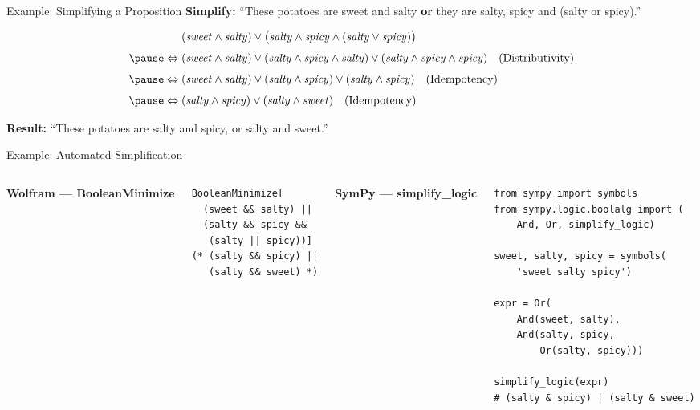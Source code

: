 \documentclass[aspectratio=169]{beamer}
\newcommand{\codelabel}[1]{\textbf{\footnotesize\color{dmDarkBlue}#1}\par\smallskip}
\newcommand{\Iff}{\Leftrightarrow}
\begin{document}
\begin{frame}{Example: Simplifying a Proposition}
  \textbf{Simplify:} ``These potatoes are sweet and salty \textbf{or} they are
  salty, spicy and (salty or spicy).''

  \medskip
  \small
  \begin{align*}
    & (\mathit{sweet} \land \mathit{salty})
      \lor
      \bigl(\mathit{salty} \land \mathit{spicy}
            \land (\mathit{salty} \lor \mathit{spicy})\bigr) \\[4pt]
    \pause
    \Iff\;
    & (\mathit{sweet} \land \mathit{salty})
      \lor (\mathit{salty} \land \mathit{spicy} \land \mathit{salty})
      \lor (\mathit{salty} \land \mathit{spicy} \land \mathit{spicy})
      \quad\text{(Distributivity)} \\[4pt]
    \pause
    \Iff\;
    & (\mathit{sweet} \land \mathit{salty})
      \lor (\mathit{salty} \land \mathit{spicy})
      \lor (\mathit{salty} \land \mathit{spicy})
      \quad\text{(Idempotency)} \\[4pt]
    \pause
    \Iff\;
    & (\mathit{salty} \land \mathit{spicy})
      \lor (\mathit{salty} \land \mathit{sweet})
      \quad\text{(Idempotency)}
  \end{align*}
  \normalsize

  \pause
  \bigskip
  \textbf{Result:} ``These potatoes are salty and spicy, or salty and sweet.''
\end{frame}

\begin{frame}[fragile]{Example: Automated Simplification}
  \begin{columns}[T]
      \codelabel{Wolfram — BooleanMinimize}
\begin{lstlisting}[style=wolfram]
BooleanMinimize[
  (sweet && salty) ||
  (salty && spicy &&
   (salty || spicy))]
(* (salty && spicy) ||
   (salty && sweet) *)
\end{lstlisting}
      \codelabel{SymPy — simplify\_logic}
\begin{lstlisting}[style=python]
from sympy import symbols
from sympy.logic.boolalg import (
    And, Or, simplify_logic)

sweet, salty, spicy = symbols(
    'sweet salty spicy')

expr = Or(
    And(sweet, salty),
    And(salty, spicy,
        Or(salty, spicy)))

simplify_logic(expr)
# (salty & spicy) | (salty & sweet)
\end{lstlisting}
  \end{columns}
\end{frame}
\end{document}
